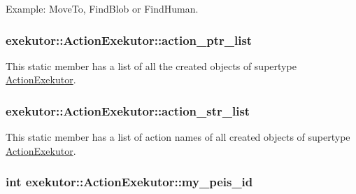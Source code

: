 \-Example\-: \-Move\-To, \-Find\-Blob or \-Find\-Human. \hypertarget{classexekutor_1_1ActionExekutor_a73c4f2607b0725f5b201cf501cb42578}{
\subsubsection[{action\-\_\-ptr\-\_\-list}]{ {\bf exekutor\-::\-Action\-Exekutor\-::action\-\_\-ptr\-\_\-list}}}\label{classexekutor_1_1ActionExekutor_a73c4f2607b0725f5b201cf501cb42578}


\-This static member has a list of all the created objects of supertype \hyperlink{classexekutor_1_1ActionExekutor}{\-Action\-Exekutor}. 

\hypertarget{classexekutor_1_1ActionExekutor_a0dc39a7a2a3a67d2bdd366f9e6e682a2}{
\subsubsection[{action\-\_\-str\-\_\-list}]{ {\bf exekutor\-::\-Action\-Exekutor\-::action\-\_\-str\-\_\-list}}}\label{classexekutor_1_1ActionExekutor_a0dc39a7a2a3a67d2bdd366f9e6e682a2}


\-This static member has a list of action names of all created objects of supertype \hyperlink{classexekutor_1_1ActionExekutor}{\-Action\-Exekutor}. 

\hypertarget{classexekutor_1_1ActionExekutor_a31644a88e4d0166c2d3a70bab9eb5b99}{
\subsubsection[{my\-\_\-peis\-\_\-id}]{\setlength{\rightskip}{0pt plus 5cm}int {\bf exekutor\-::\-Action\-Exekutor\-::my\-\_\-peis\-\_\-id}}}\label{classexekutor_1_1ActionExekutor_a31644a88e4d0166c2d3a70bab9eb5b99}


